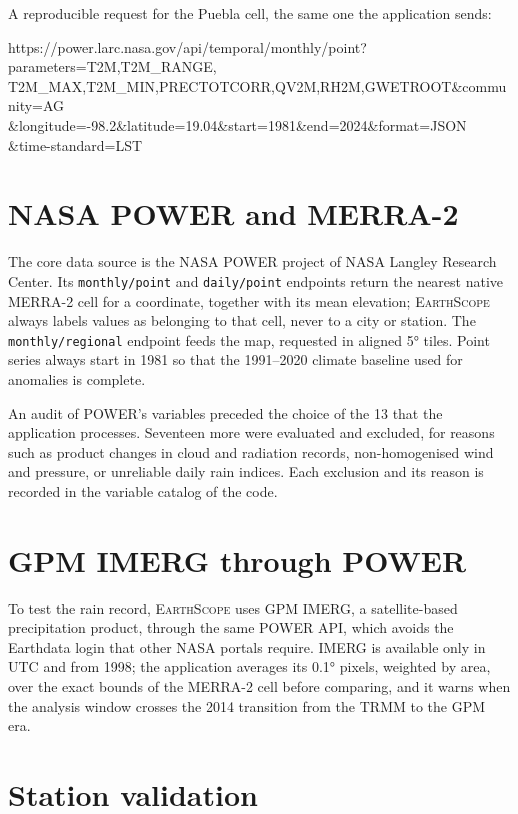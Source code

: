 \documentclass[12pt, oneside, openany]{report}
\newcommand{\EarthScope}{\textsc{EarthScope}}
\begin{document}
\noindent A reproducible request for the Puebla cell, the same one the application sends:

\begin{center}
\footnotesize
\begin{minipage}{0.95\linewidth}
\raggedright\ttfamily
https://power.larc.nasa.gov/api/temporal/monthly/point?parameters=T2M,T2M\_RANGE, T2M\_MAX,T2M\_MIN,PRECTOTCORR,QV2M,RH2M,GWETROOT\&community=AG \&longitude=-98.2\&latitude=19.04\&start=1981\&end=2024\&format=JSON \&time-standard=LST
\end{minipage}
\end{center}

\section{NASA POWER and MERRA-2}

The core data source is the NASA POWER project of NASA Langley Research Center. Its \texttt{monthly/point} and \texttt{daily/point} endpoints return the nearest native MERRA-2 cell for a coordinate, together with its mean elevation; \EarthScope{} always labels values as belonging to that cell, never to a city or station. The \texttt{monthly/regional} endpoint feeds the map, requested in aligned \ang{5} tiles. Point series always start in 1981 so that the 1991--2020 climate baseline used for anomalies is complete.

An audit of POWER's variables preceded the choice of the 13 that the application processes. Seventeen more were evaluated and excluded, for reasons such as product changes in cloud and radiation records, non-homogenised wind and pressure, or unreliable daily rain indices. Each exclusion and its reason is recorded in the variable catalog of the code.

\section{GPM IMERG through POWER}

To test the rain record, \EarthScope{} uses GPM IMERG, a satellite-based precipitation product, through the same POWER API, which avoids the Earthdata login that other NASA portals require. IMERG is available only in UTC and from 1998; the application averages its \ang{0.1} pixels, weighted by area, over the exact bounds of the MERRA-2 cell before comparing, and it warns when the analysis window crosses the 2014 transition from the TRMM to the GPM era.

\section{Station validation}
\end{document}
